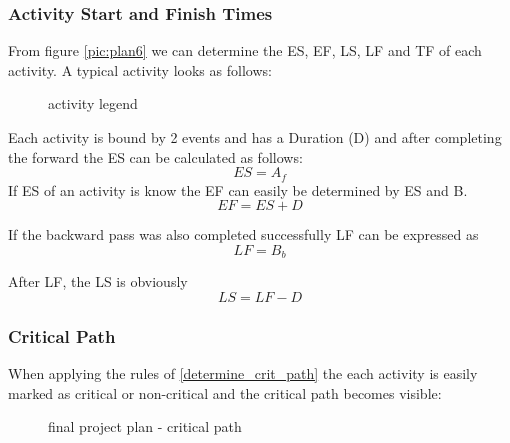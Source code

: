 \subsubsection{Activity Start and Finish Times}
From figure \ref{pic:plan6} we can determine the ES, EF, LS, LF and TF of each activity. A typical activity looks as follows:
\begin{figure}[h] 
\centerline{}
\label{pic:activity_plan}
\caption{activity legend}
\end{figure}
Each activity is bound by 2 events and has a Duration (D) and after completing the forward the ES can be calculated as follows:
\begin{equation}
ES = A_{f}
\end{equation}
If ES of an activity is know the EF can easily be determined by ES and B.
\begin{equation}
EF = ES + D
\end{equation}

If the backward pass was also completed successfully LF can be expressed as
\begin{equation}
LF = B_{b}
\end{equation}

After LF, the LS is obviously
\begin{equation}
LS = LF - D
\end{equation}

\subsubsection{Critical Path}

When applying the rules of \ref{determine_crit_path} the each activity is easily marked as critical or non-critical and the critical path becomes visible:
\begin{figure}[h] 
\centerline{}
\label{pic:plan7}
\caption{final project plan - critical path}
\end{figure}







